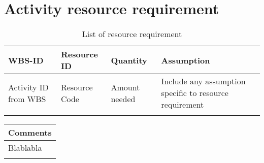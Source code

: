 \section{Activity resource requirement}

\begin{longtable}{>{\raggedright\arraybackslash}p{1.8cm} >{\raggedright\arraybackslash}p{2.3cm} >{\raggedright\arraybackslash}p{2.3cm}>{\raggedright\arraybackslash}p{6.5cm}}
	
	\toprule[2pt]
	
	\textbf{WBS-ID} & \textbf{Resource ID} & \textbf{Quantity} & \textbf{Assumption} 
	\\ \midrule[1.5pt] 
	
	Activity ID from WBS & Resource Code & Amount needed & Include any assumption specific to resource requirement \\
	\bottomrule[2pt]
	
	\caption{List of resource requirement}
	\label{table_resourcerequirement}	
\end{longtable}

\begin{longtable}{>{\raggedright\arraybackslash}p{14.2cm}}
	
	\toprule[2pt]
	
	\textbf{Comments} 
	\\ \midrule[1.5pt] 
	
	Blablabla \\
	\bottomrule[2pt]
	
	\label{table_resourcecomments}
\end{longtable}